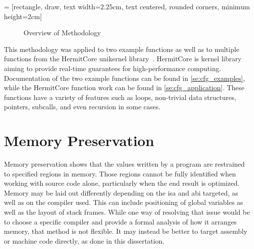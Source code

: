  = [rectangle, draw, text width=2.25cm, text centered, rounded corners, minimum height=2cm]
\begin{figure}
  \centering
  \caption{Overview of Methodology}\label{fig:cfg_overview}
\end{figure}

This methodology was applied to two example functions
as well as to multiple functions
from the HermitCore unikernel library~\citep{lankes2016hermitcore}.
HermitCore is  kernel library aiming to provide real-time guarantees for high-performance computing.
Documentation of the two example functions can be found in \cref{se:cfg_examples},
while the HermitCore function work can be found in \cref{se:cfg_application}.
These functions have a variety of features such as loops,
non-trivial data structures, pointers, subcalls, and even recursion in some cases.

\section{Memory Preservation}\label{se:memory_preservation}
Memory preservation shows that the values written by a program
are restrained to specified regions in memory.
Those regions cannot be fully identified when working with source code alone,
particularly when the end result is optimized.
Memory may be laid out differently depending on the \ac{isa} and \ac{abi} targeted,
as well as on the compiler used.
This can include positioning of global variables as well as the layout of stack frames.
While one way of resolving that issue would be to choose a specific compiler
and provide a formal analysis of how it arranges memory, that method is not flexible.
It may instead be better to target assembly or machine code directly,
as done in this dissertation.


